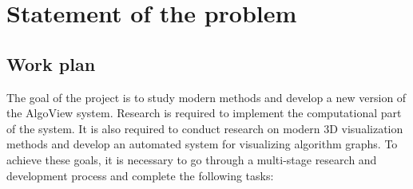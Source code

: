 \section{Statement of the problem}

\subsection{Work plan}

The goal of the project is to study modern methods and develop a new version of the AlgoView system. Research is required to implement the computational part of the system. It is also required to conduct research on modern 3D visualization methods and develop an automated system for visualizing algorithm graphs. To achieve these goals, it is necessary to go through a multi-stage research and development process and complete the following tasks:

